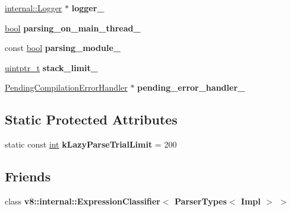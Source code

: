 \begin{DoxyCompactItemize}
\item 
\mbox{\label{classv8_1_1internal_1_1ParserBase_aa50be2f5b3071cce696259e4f732f837}} 
\mbox{\hyperlink{classv8_1_1internal_1_1Logger}{internal\+::\+Logger}} $\ast$ {\bfseries logger\+\_\+}
\item 
\mbox{\label{classv8_1_1internal_1_1ParserBase_a526bb3cbe445590bd9b38c6044792ca9}} 
\mbox{\hyperlink{classbool}{bool}} {\bfseries parsing\+\_\+on\+\_\+main\+\_\+thread\+\_\+}
\item 
\mbox{\label{classv8_1_1internal_1_1ParserBase_acc9546b3c6e687bd3348be6f4ae9e671}} 
const \mbox{\hyperlink{classbool}{bool}} {\bfseries parsing\+\_\+module\+\_\+}
\item 
\mbox{\label{classv8_1_1internal_1_1ParserBase_a6201f3392fe4f9465f2942c30e5a0a48}} 
\mbox{\hyperlink{classuintptr__t}{uintptr\+\_\+t}} {\bfseries stack\+\_\+limit\+\_\+}
\item 
\mbox{\label{classv8_1_1internal_1_1ParserBase_a96c18f70ce479e88ac8b932ec41ad876}} 
\mbox{\hyperlink{classv8_1_1internal_1_1PendingCompilationErrorHandler}{Pending\+Compilation\+Error\+Handler}} $\ast$ {\bfseries pending\+\_\+error\+\_\+handler\+\_\+}
\end{DoxyCompactItemize}
\subsection*{Static Protected Attributes}
\begin{DoxyCompactItemize}
\item 
\mbox{\label{classv8_1_1internal_1_1ParserBase_ac3a801063d3576897a4a934697f869ba}} 
static const \mbox{\hyperlink{classint}{int}} {\bfseries k\+Lazy\+Parse\+Trial\+Limit} = 200
\end{DoxyCompactItemize}
\subsection*{Friends}
\begin{DoxyCompactItemize}
\item 
\mbox{\label{classv8_1_1internal_1_1ParserBase_ae5d0b5b50d6f86302167ec9dceb0502d}} 
class {\bfseries v8\+::internal\+::\+Expression\+Classifier$<$ Parser\+Types$<$ Impl $>$ $>$}
\end{DoxyCompactItemize}


